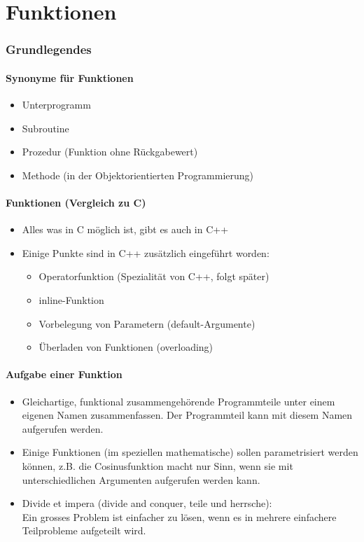 
\part{Funktionen}

\section{Grundlegendes}

\begin{multicols}{2}
\subsection{Synonyme für Funktionen}
\begin{itemize}
	\item Unterprogramm
	\item Subroutine
	\item Prozedur (Funktion ohne Rückgabewert)
	\item Methode (in der Objektorientierten Programmierung)
\end{itemize}
\vfill\null
\columnbreak
\subsection{Funktionen (Vergleich zu C)}
\begin{itemize}
	\item Alles was in C möglich ist, gibt es auch in C++
	\item Einige Punkte sind in C++ zusätzlich eingeführt worden:
	\begin{itemize}
		\item Operatorfunktion (Spezialität von C++, folgt später)
		\item inline-Funktion
		\item Vorbelegung von Parametern (default-Argumente)
		\item Überladen von Funktionen (overloading)
	\end{itemize}
\end{itemize}
\end{multicols}

\subsection{Aufgabe einer Funktion}
\begin{itemize}
	\item Gleichartige, funktional zusammengehörende Programmteile unter einem eigenen Namen zusammenfassen. Der Programmteil kann mit diesem Namen aufgerufen werden.
	\item Einige Funktionen (im speziellen mathematische) sollen parametrisiert werden können, z.B. die Cosinusfunktion macht nur Sinn, wenn sie mit unterschiedlichen Argumenten aufgerufen werden kann.
	\item Divide et impera (divide and conquer, teile und herrsche):\\
	Ein grosses Problem ist einfacher zu lösen, wenn es in mehrere einfachere Teilprobleme aufgeteilt wird.
\end{itemize}

